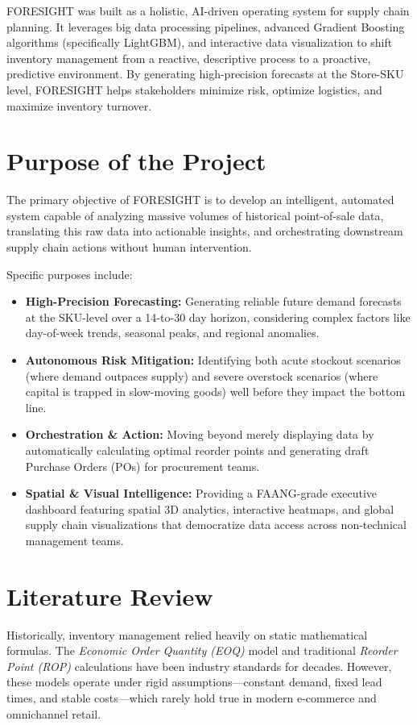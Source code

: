 \documentclass[12pt,a4paper]{report}
\begin{document}
FORESIGHT was built as a holistic, AI-driven operating system for supply chain planning. It leverages big data processing pipelines, advanced Gradient Boosting algorithms (specifically LightGBM), and interactive data visualization to shift inventory management from a reactive, descriptive process to a proactive, predictive environment. By generating high-precision forecasts at the Store-SKU level, FORESIGHT helps stakeholders minimize risk, optimize logistics, and maximize inventory turnover.

\section{Purpose of the Project}
The primary objective of FORESIGHT is to develop an intelligent, automated system capable of analyzing massive volumes of historical point-of-sale data, translating this raw data into actionable insights, and orchestrating downstream supply chain actions without human intervention. 

Specific purposes include:
\begin{itemize}
    \item \textbf{High-Precision Forecasting:} Generating reliable future demand forecasts at the SKU-level over a 14-to-30 day horizon, considering complex factors like day-of-week trends, seasonal peaks, and regional anomalies.
    \item \textbf{Autonomous Risk Mitigation:} Identifying both acute stockout scenarios (where demand outpaces supply) and severe overstock scenarios (where capital is trapped in slow-moving goods) well before they impact the bottom line.
    \item \textbf{Orchestration \& Action:} Moving beyond merely displaying data by automatically calculating optimal reorder points and generating draft Purchase Orders (POs) for procurement teams.
    \item \textbf{Spatial \& Visual Intelligence:} Providing a FAANG-grade executive dashboard featuring spatial 3D analytics, interactive heatmaps, and global supply chain visualizations that democratize data access across non-technical management teams.
\end{itemize}

\section{Literature Review}
Historically, inventory management relied heavily on static mathematical formulas. The \textit{Economic Order Quantity (EOQ)} model and traditional \textit{Reorder Point (ROP)} calculations have been industry standards for decades. However, these models operate under rigid assumptions—constant demand, fixed lead times, and stable costs—which rarely hold true in modern e-commerce and omnichannel retail.
\end{document}
